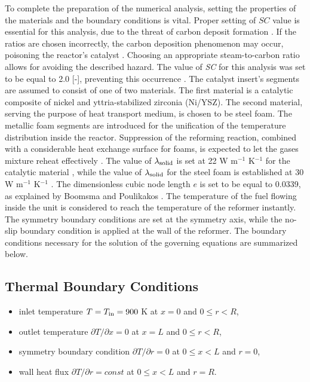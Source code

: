 \documentclass[preprint,12pt]{elsarticle}
\begin{document}
To complete the preparation of the numerical analysis, setting the properties of the materials and the boundary conditions is vital. Proper setting of $\textit{SC}$ value is essential for this analysis, due to the threat of carbon deposit formation \cite{Bartholomew1982}. If the ratios are chosen incorrectly, the carbon deposition phenomenon may occur, poisoning the reactor's catalyst \cite{Lakhapatri2009}. Choosing an appropriate steam-to-carbon ratio allows for avoiding the described hazard. The value of \textit{SC} for this analysis was set to be equal to 2.0 [-], preventing this occurrence \cite{Brus2015, Tomiczek2017}. The catalyst insert's segments are assumed to consist of one of two materials. The first material is a catalytic composite of nickel and yttria-stabilized zirconia (Ni/YSZ). The second material, serving the purpose of heat transport medium, is chosen to be steel foam. The metallic foam segments are introduced for the unification of the temperature distribution inside the reactor.  Suppression of the reforming reaction, combined with a considerable heat exchange surface for foams, is expected to let the gases mixture reheat effectively \cite{Zhao2012}. The value of $\lambda_{\rm{solid}}$ is set at 22 W m$^{-1}$ K$^{-1}$ for the catalytic material \cite{Kawashima1996}, while the value of $\lambda_{\rm{solid}}$ for the steel foam is established at 30 W m$^{-1}$ K$^{-1}$ \cite{Peet2011}. The dimensionless cubic node length $e$ is set to be equal to 0.0339, as explained by Boomsma and Poulikakos \cite{Boomsma2001}.  The temperature of the fuel flowing inside the unit is considered to reach the temperature of the reformer instantly. The symmetry boundary conditions are set at the symmetry axis, while the no-slip boundary condition is applied at the wall of the reformer. The boundary conditions necessary for the solution of the governing equations are summarized below.

\subsection*{Thermal Boundary Conditions}
\begin{itemize}
  \item inlet temperature $T = T_{\rm{in}} = 900$ K \hspace*{\fill} \hfill at $x = 0$ and $0 \leq r < R$,
  \item outlet temperature $\partial T / \partial x = 0$ \hspace*{\fill} \hfill at $x = L$ and $0 \leq r < R$,
  \item symmetry boundary condition $\partial T / \partial r = 0$ \hspace*{\fill} \hfill at $0 \leq x < L$ and $r = 0$,
  \item wall heat flux $\partial T / \partial r =  const$ \hspace*{\fill} \hfill at $0 \leq x < L$ and $r = R$.
\end{itemize}
\end{document}
